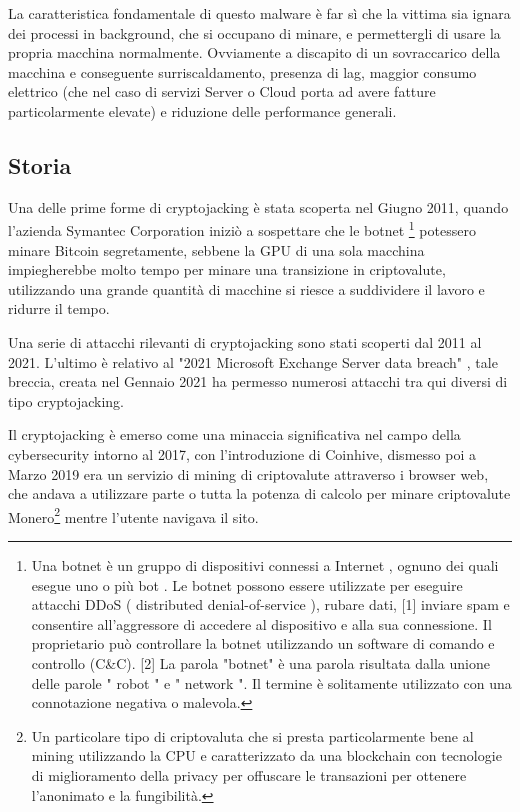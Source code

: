 \documentclass[12pt,a4paper]{article}
\begin{document}
La caratteristica fondamentale di questo malware è far sì che la vittima sia 
ignara dei processi in background, che si occupano di minare, e permettergli di usare 
la propria macchina normalmente. Ovviamente a discapito di un sovraccarico della macchina 
e conseguente surriscaldamento, presenza di lag, maggior consumo elettrico 
(che nel caso di servizi Server o Cloud porta ad avere fatture particolarmente elevate) 
e riduzione delle performance generali.

\subsection{Storia}

Una delle prime forme di cryptojacking è stata scoperta nel Giugno 2011, quando
l'azienda Symantec Corporation iniziò a sospettare che le botnet \footnote{Una botnet è
un gruppo di dispositivi connessi a Internet , ognuno dei quali esegue uno o più
bot . Le botnet possono essere utilizzate per eseguire attacchi DDoS (
distributed denial-of-service ), rubare dati, [1] inviare spam e consentire
all'aggressore di accedere al dispositivo e alla sua connessione. Il
proprietario può controllare la botnet utilizzando un software di comando e
controllo (C\&C). [2] La parola "botnet" è una parola risultata dalla unione delle parole "
robot " e " network ". Il termine è solitamente utilizzato con una connotazione
negativa o malevola.\cite{botnet}} potessero minare Bitcoin segretamente, sebbene la GPU 
di una sola macchina impiegherebbe molto tempo per minare una transizione in criptovalute, 
utilizzando una grande quantità di macchine si riesce a suddividere il lavoro e ridurre il tempo.

Una serie di attacchi rilevanti di cryptojacking sono stati scoperti dal 2011 al
2021. L'ultimo è relativo al "2021 Microsoft Exchange Server data breach"
\cite{zero-day}, tale breccia, creata nel Gennaio 2021 ha permesso numerosi
attacchi tra qui diversi di tipo cryptojacking.

Il cryptojacking è emerso come una minaccia significativa nel campo della
cybersecurity intorno al 2017, con l'introduzione di Coinhive, dismesso poi a
Marzo 2019 era un servizio di mining di criptovalute attraverso i browser web,
che andava a utilizzare parte o tutta la potenza di calcolo per minare
criptovalute Monero\footnote{Un particolare tipo di criptovaluta che si presta
particolarmente bene al mining utilizzando la CPU e caratterizzato da una
blockchain con tecnologie di miglioramento della privacy per offuscare le
transazioni per ottenere l'anonimato e la fungibilità.\cite{Monero}} mentre l'utente navigava
il sito. 
\end{document}
